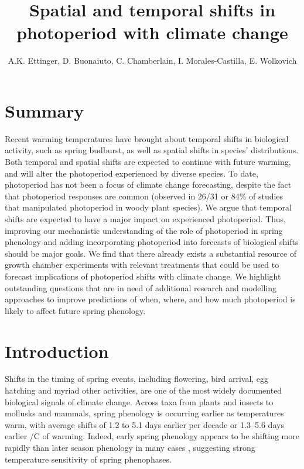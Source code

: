 \documentclass{article}
\begin{document}
 
\title{Spatial and temporal shifts in photoperiod with climate change} %

\author{A.K. Ettinger, D. Buonaiuto, C. Chamberlain, I. Morales-Castilla, E. Wolkovich}
\maketitle  %


\section*{Summary}
Recent warming temperatures have brought about temporal shifts in biological activity, such as spring budburst, as well as spatial shifts in species' distributions. Both temporal and spatial shifts are expected to continue with future warming, and will alter the photoperiod experienced by diverse species. To date, photoperiod has not been a focus of climate change forecasting, despite the fact that photoperiod responses are common (observed in 26/31 or 84\% of studies that manipulated photoperiod in woody plant species). We argue that temporal shifts are expected to have a major impact on experienced photoperiod. Thus, improving our mechanistic understanding of the role of photoperiod in spring phenology and adding incorporating photoperiod into forecasts of biological shifts should be major goals. We find that there already exists a substantial resource of growth chamber experiments with relevant treatments that could be used to forecast implications of photoperiod shifts with climate change. We highlight outstanding questions that are in need of additional research and modelling approaches to improve predictions of when, where, and how much photoperiod is likely to affect future spring phenology.

\section*{Introduction}
\par Shifts in the timing of spring events, including flowering, bird arrival, egg hatching and myriad other activities, are one of the most widely documented biological signals of climate change. Across taxa from plants and insects to mollusks and mammals, spring phenology is occurring earlier as temperatures warm, with average shifts of 1.2 to 5.1 days earlier per decade \citep{bradley1999,parmesan2003, root2003} or 1.3–5.6 days earlier /\degree C of warming\citep{wolkovich2012,polgar2013}. Indeed, early spring phenology appears to be shifting more rapidly than later season phenology in many cases \citep{bradley1999,menzel2006}, suggesting strong temperature sensitivity of spring phenophases.
\end{document}
